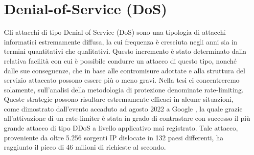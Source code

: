 \section{Denial-of-Service (DoS)}

Gli attacchi di tipo Denial-of-Service (DoS) sono una tipologia di attacchi informatici estremamente diffusa, la cui
frequenza è cresciuta negli anni sia in termini quantitativi che qualitativi. Questo incremento è stato determinato
dalla relativa facilità con cui è possibile condurre un attacco di questo tipo, nonché dalle sue conseguenze, che in
base alle contromisure adottate e alla struttura del servizio attaccato possono essere più o meno gravi. Nella tesi ci
concentreremo solamente, sull’analisi della metodologia di protezione denominate rate-limiting. Queste strategie possono
risultare estremamente efficaci in alcune situazioni, come dimostrato dall’evento accaduto ad agosto 2022 a Google \cite{google_ddos},
la quale grazie all’attivazione di un rate-limiter è stata in grado di contrastare con successo il più grande attacco di tipo
DDoS a livello applicativo mai registrato. Tale attacco, proveniente da oltre 5.256 sorgenti IP dislocate in 132 paesi
differenti, ha raggiunto il picco di 46 milioni di richieste al secondo. 

